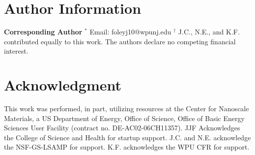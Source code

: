 \documentclass[journal=jpclcd,manuscript=article]{achemso}
\begin{document}
\section{Author Information}
{\bf Corresponding Author}
$^*$ Email: foleyj10@wpunj.edu
\newline
$^{\dagger}$  J.C., N.E., and K.F. contributed equally to this work.
\newline
The authors declare no competing financial interest.

\section{Acknowledgment}
This work was performed, in part, utilizing resources at
the Center for Nanoscale Materials, a US Department of Energy, Office of Science, Office of
Basic Energy Sciences User Facility (contract no. DE-AC02-06CH11357).
JJF Acknowledges the College of Science and Health for startup support.
J.C. and N.E. acknowledge the NSF-GS-LSAMP for support.  K.F. acknowledges the WPU CFR for support.


 
\end{document}
